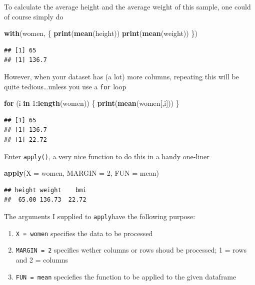 \documentclass[]{book}
\newenvironment{Shaded}{\begin{snugshade}}{\end{snugshade}}
\newcommand{\ControlFlowTok}[1]{\textcolor[rgb]{0.13,0.29,0.53}{\textbf{#1}}}
\newcommand{\DataTypeTok}[1]{\textcolor[rgb]{0.13,0.29,0.53}{#1}}
\newcommand{\DecValTok}[1]{\textcolor[rgb]{0.00,0.00,0.81}{#1}}
\newcommand{\KeywordTok}[1]{\textcolor[rgb]{0.13,0.29,0.53}{\textbf{#1}}}
\newcommand{\NormalTok}[1]{#1}
\newcommand{\OperatorTok}[1]{\textcolor[rgb]{0.81,0.36,0.00}{\textbf{#1}}}
\providecommand{\tightlist}{%
  \setlength{\itemsep}{0pt}\setlength{\parskip}{0pt}}
\begin{document}
To calculate the average height and the average weight of this sample, one could of course simply do

\begin{Shaded}
\begin{Highlighting}[]
\KeywordTok{with}\NormalTok{(women, \{}
    \KeywordTok{print}\NormalTok{(}\KeywordTok{mean}\NormalTok{(height))}
    \KeywordTok{print}\NormalTok{(}\KeywordTok{mean}\NormalTok{(weight))}
\NormalTok{\})}
\end{Highlighting}
\end{Shaded}

\begin{verbatim}
## [1] 65
## [1] 136.7
\end{verbatim}

However, when your dataset has (a lot) more columns, repeating this will be quite tedious\ldots{}unless you use a \texttt{for} loop

\begin{Shaded}
\begin{Highlighting}[]
\ControlFlowTok{for}\NormalTok{ (i }\ControlFlowTok{in} \DecValTok{1}\OperatorTok{:}\KeywordTok{length}\NormalTok{(women)) \{}
    \KeywordTok{print}\NormalTok{(}\KeywordTok{mean}\NormalTok{(women[,i]))}
\NormalTok{\}}
\end{Highlighting}
\end{Shaded}

\begin{verbatim}
## [1] 65
## [1] 136.7
## [1] 22.72
\end{verbatim}

Enter \texttt{apply()}, a very nice function to do this in a handy one-liner

\begin{Shaded}
\begin{Highlighting}[]
\KeywordTok{apply}\NormalTok{(}\DataTypeTok{X =}\NormalTok{ women, }\DataTypeTok{MARGIN =} \DecValTok{2}\NormalTok{, }\DataTypeTok{FUN =}\NormalTok{ mean)}
\end{Highlighting}
\end{Shaded}

\begin{verbatim}
## height weight    bmi 
##  65.00 136.73  22.72
\end{verbatim}

The arguments I supplied to \texttt{apply}have the following purpose:

\begin{enumerate}
\def\labelenumi{\arabic{enumi}.}
\tightlist
\item
  \texttt{X\ =\ women} specifies the data to be processed
\item
  \texttt{MARGIN\ =\ 2} specifies wether columns or rows shoud be processed; 1 = rows and 2 = columns
\item
  \texttt{FUN\ =\ mean} speciefies the function to be applied to the given dataframe
\end{enumerate}
\end{document}
